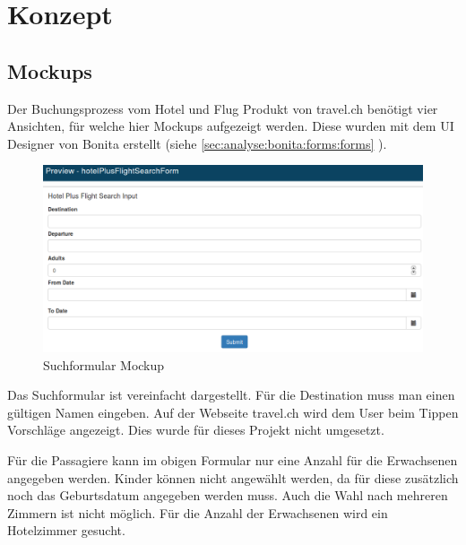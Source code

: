 
\chapter{Konzept}
\label{sec:konzept}

\section{Mockups}
Der Buchungsprozess vom Hotel und Flug Produkt von travel.ch benötigt vier Ansichten, für welche hier Mockups aufgezeigt werden.
Diese wurden mit dem UI Designer von Bonita erstellt (siehe \cref{sec:analyse:bonita:forms:forms} ).

\begin{figure}[H]
	\centering
	\includegraphics[width=1\textwidth]{images/forms-search.png}
	\caption{Suchformular Mockup}
	\label{fig:konzept:mockups:search}
\end{figure}

Das Suchformular ist vereinfacht dargestellt. Für die Destination muss man einen gültigen Namen eingeben. Auf der Webseite travel.ch wird dem User beim Tippen Vorschläge angezeigt. Dies wurde für dieses Projekt nicht umgesetzt.

Für die Passagiere kann im obigen Formular nur eine Anzahl für die Erwachsenen angegeben werden. Kinder können nicht angewählt werden, da für diese zusätzlich noch das Geburtsdatum angegeben werden muss. Auch die Wahl nach mehreren Zimmern ist nicht möglich. Für die Anzahl der Erwachsenen wird ein Hotelzimmer gesucht.

